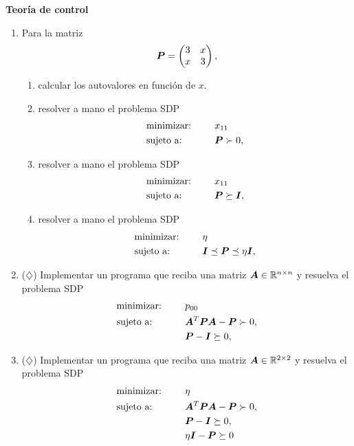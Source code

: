 \documentclass[11pt]{article}
\begin{document}
\noindent \textbf{Teoría de control}

\begin{enumerate}[resume]

\item Para la matriz
$$
\bm{P} = \begin{pmatrix} 3 & x \\ x & 3 \end{pmatrix},
$$
\begin{enumerate}
\item calcular los autovalores en función de $x$.
\item resolver a mano el problema SDP
\begin{alignat*}{2}
  & \text{minimizar: } & & x_{11} \\
   & \text{sujeto a: } & \quad & \bm{P} \succ 0, \\
\end{alignat*}
\item resolver a mano el problema SDP
\begin{alignat*}{2}
  & \text{minimizar: } & & x_{11} \\
   & \text{sujeto a: } & \quad & \bm{P} \succeq \bm{I}, \\
\end{alignat*}
\item resolver a mano el problema SDP
\begin{alignat*}{2}
  & \text{minimizar: } & \quad & \eta \\
   & \text{sujeto a: } & & \bm{I} \preceq \bm{P} \preceq \eta \bm{I}, \\
\end{alignat*}
\end{enumerate}

\item ($\diamondsuit$) Implementar un programa que reciba una matriz $\bm{A} \in \mathbb{R}^{n \times n}$ y resuelva el problema SDP
\begin{alignat*}{2}
  & \text{minimizar: } & & p_{00} \\
   & \text{sujeto a: } & \quad & \bm{A}^T \bm{P} \bm{A} - \bm{P} \succ 0, \\
   &&& \bm{P} - \bm{I} \succeq 0, \\
\end{alignat*}

\item ($\diamondsuit$) Implementar un programa que reciba una matriz $\bm{A} \in \mathbb{R}^{2 \times 2}$ y resuelva el problema SDP
\begin{alignat*}{2}
  & \text{minimizar: } & & \eta \\
   & \text{sujeto a: } & \quad & \bm{A}^T \bm{P} \bm{A} - \bm{P} \succ 0, \\
   &&& \bm{P} - \bm{I} \succeq 0, \\
   &&& \eta \bm{I} - \bm{P} \succeq 0
\end{alignat*}


\end{enumerate}
\end{document}
